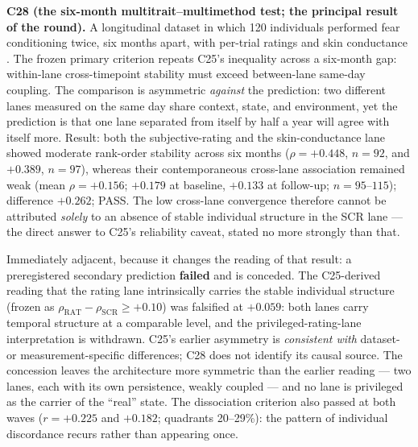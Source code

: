\documentclass[9pt,twocolumn]{article}
\begin{document}
\textbf{C28 (the six-month multitrait--multimethod test; the principal result of the round).} A longitudinal dataset in which 120 individuals performed fear conditioning twice, six months apart, with per-trial ratings and skin conductance \cite{rankstab2022}. The frozen primary criterion repeats C25's inequality across a six-month gap: within-lane cross-timepoint stability must exceed between-lane same-day coupling. The comparison is asymmetric \emph{against} the prediction: two different lanes measured on the same day share context, state, and environment, yet the prediction is that one lane separated from itself by half a year will agree with itself more. Result: both the subjective-rating and the skin-conductance lane showed moderate rank-order stability across six months ($\rho=+0.448$, $n{=}92$, and $+0.389$, $n{=}97$), whereas their contemporaneous cross-lane association remained weak (mean $\rho=+0.156$; $+0.179$ at baseline, $+0.133$ at follow-up; $n{=}95$--$115$); difference $+0.262$; PASS. The low cross-lane convergence therefore cannot be attributed \emph{solely} to an absence of stable individual structure in the SCR lane --- the direct answer to C25's reliability caveat, stated no more strongly than that.

Immediately adjacent, because it changes the reading of that result: a preregistered secondary prediction \textbf{failed} and is conceded. The C25-derived reading that the rating lane intrinsically carries the stable individual structure (frozen as $\rho_{\mathrm{RAT}}-\rho_{\mathrm{SCR}}\ge+0.10$) was falsified at $+0.059$: both lanes carry temporal structure at a comparable level, and the privileged-rating-lane interpretation is withdrawn. C25's earlier asymmetry is \emph{consistent with} dataset- or measurement-specific differences; C28 does not identify its causal source. The concession leaves the architecture more symmetric than the earlier reading --- two lanes, each with its own persistence, weakly coupled --- and no lane is privileged as the carrier of the ``real'' state. The dissociation criterion also passed at both waves ($r=+0.225$ and $+0.182$; quadrants 20--29\%): the pattern of individual discordance recurs rather than appearing once.
\end{document}
